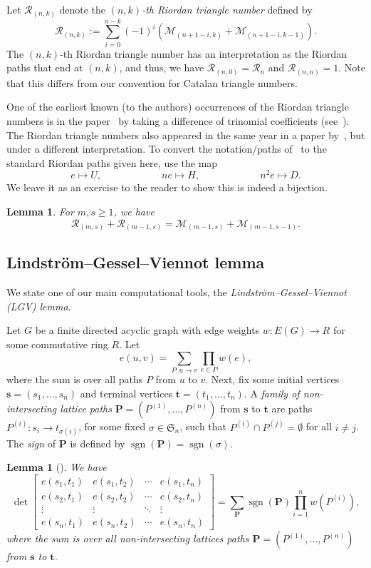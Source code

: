 \documentclass[11pt, leqno]{amsart}
\theoremstyle{plain}
\newtheorem{lemma}[theorem]{Lemma}
\theoremstyle{definition}
\numberwithin{equation}{section}
\newcommand{\seteq}{\mathbin{:=}}
\newcommand{\Mot}{\mathcal{M}} %
\newcommand{\Rior}{\mathcal{R}} %
\newcommand{\nilp}{\mathbf{P}} %
\newcommand{\sgn}{\operatorname{sgn}} %
\newcommand{\defn}[1]{{\color{darkred}\emph{#1}}} %
\begin{document}
Let $\Rior_{(n,k)}$ denote the \defn{$(n,k)$-th Riordan triangle number} defined by
\[
\Rior_{(n,k)} \seteq \sum_{i=0}^{n-k} (-1)^i (\Mot_{(n+1-i,k)} + \Mot_{(n+1-i,k-1)}).
\]
The $(n,k)$-th Riordan triangle number has an interpretation as the Riordan paths that end at $(n,k)$, and thus, we have $\Rior_{(n,0)} = \Rior_n$ and $\Rior_{(n,n)} = 1$. Note that this differs from our convention for Catalan triangle numbers.

One of the earliest known (to the authors) occurrences of the Riordan triangle numbers is in the paper~\cite{Bernhart97} by taking a difference of trinomial coefficients (see~\cite[Fig.~22(b)]{Bernhart97}). The Riordan triangle numbers also appeared in the same year in a paper by~\cite[Fig.~5]{MRSV97}, but under a different interpretation. To convert the notation/paths of~\cite{MRSV97} to the standard Riordan paths given here, use the map
\[
e \mapsto U,
\qquad\qquad\qquad
ne \mapsto H,
\qquad\qquad\qquad
n^2e \mapsto D.
\]
We leave it as an exercise to the reader to show this is indeed a bijection. 

\begin{lemma} \label{lem:Mot_Rio_relation} \cite[Lemma~4.10]{KLO17} For $m,s \ge 1$, we have
\[
\Rior_{(m,s)} + \Rior_{(m-1,s)}=\Mot_{(m-1,s)} + \Mot_{(m-1,s-1)}.
\]
\end{lemma}


\subsection{Lindstr\"om--Gessel--Viennot lemma}

We state one of our main computational tools, the \defn{Lindstr\"om--Gessel--Viennot (LGV) lemma}.

Let $G$ be a finite directed acyclic graph with edge weights $w \colon E(G) \to R$ for some commutative ring $R$. Let
\[
e(u, v) = \sum_{P \colon u \to v} \prod_{e \in P} w(e),
\]
where the sum is over all paths $P$ from $u$ to $v$. Next, fix some initial vertices $\mathbf{s} = (s_1, \dotsc, s_n)$ and terminal vertices $\mathbf{t} = (t_1, \dotsc, t_n)$. A \defn{family of non-intersecting lattice paths} $\nilp = (P^{(1)}, \dotsc, P^{(n)})$ from $\mathbf{s}$ to $\mathbf{t}$ are paths $P^{(i)} \colon s_i \to t_{\sigma(i)}$, for some fixed $\sigma \in \mathfrak{S}_n$, such that $P^{(i)} \cap P^{(j)} = \emptyset$ for all $i \neq j$. The \defn{sign} of $\nilp$ is defined by $\sgn(\nilp) = \sgn(\sigma)$.

\begin{lemma}[{\cite{Lindstrom73,GV85}}]
\label{lemma:LGV}
We have
\[
\det \begin{bmatrix}
e(s_1, t_1) & e(s_1, t_2) & \cdots & e(s_1, t_n) \\
e(s_2, t_1) & e(s_2, t_2) & \cdots & e(s_2, t_n) \\
\vdots & \vdots & \ddots & \vdots \\
e(s_n, t_1) & e(s_n, t_2) & \cdots & e(s_n, t_n)
\end{bmatrix}
= \sum_{\nilp} \sgn(\nilp) \prod_{i=1}^n w(P^{(i)}),
\]
where the sum is over all non-intersecting lattices paths $\nilp = (P^{(1)}, \dotsc, P^{(n)})$ from $\mathbf{s}$ to $\mathbf{t}$.
\end{lemma}
\end{document}
